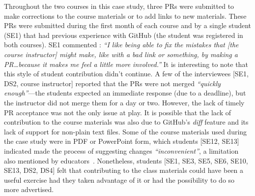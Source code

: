 Throughout the two courses in this case study, three PRs were submitted to make corrections to the course materials or to add links to new materials. These PRs were submitted during the first month of each course and by a single student (SE1) that had previous experience with GitHub (the student was registered in both courses). SE1 commented : \textit{``I like being able to fix the mistakes that [the course instructor] might make, like with a bad link or something, by making a PR\ldots because it makes me feel a little more involved.''} It is interesting to note that this style of student contribution didn't continue. A few of the interviewees [SE1, DS2, course instructor] reported that the PRs were not merged \textit{``quickly enough''}---the students expected an immediate response (due to a deadline), but the instructor did not merge them for a day or two. However, the lack of timely PR acceptance was not the only issue at play. It is possible that the lack of contribution to the course materials was also due to GitHub's \emph{diff} feature and its lack of support for non-plain text files. Some of the course materials used during the case study were in PDF or PowerPoint form, which students [SE12, SE13] indicated made the process of suggesting changes \textit{``inconvenient''}, a limitation also mentioned by educators~\cite{zagalsky2015emergence}. Nonetheless, students [SE1, SE3, SE5, SE6, SE10, SE13, DS2, DS4] felt that contributing to the class materials could have been a useful exercise had they taken advantage of it or had the possibility to do so more advertised.



